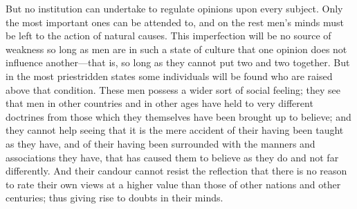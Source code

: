 But no institution can undertake to regulate opinions upon every
subject. Only the most important ones can be attended to, and on the
rest men's minds must be left to the action of natural causes. This
imperfection will be no source of weakness so long as men are in such
a state of culture that one opinion does not influence
an\-oth\-er---that is, so long as they cannot put two and two
together. But in the most priestridden states some individuals will be
found who are raised above that condition. These men possess a wider
sort of social  feeling; they see that men in other countries
and in other ages have held to very different doctrines from those
which they themselves have been brought up to believe; and they cannot
help seeing that it is the mere accident of their having been taught
as they have, and of their having been surrounded with the manners and
associations they have, that has caused them to believe as they do and
not far differently. And their candour cannot resist the reflection
that there is no reason to rate their own views at a higher value than
those of other nations and other centuries; thus giving rise to doubts
in their minds.

